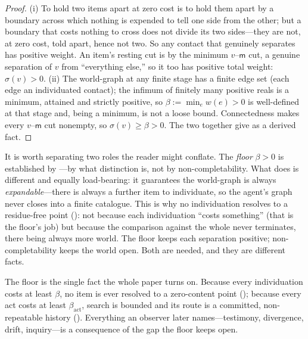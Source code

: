 \documentclass[11pt,twocolumn,a4paper]{article}
\newcommand{\wt}{w}
\newcommand{\med}{\mathsf{m}}
\newcommand{\flo}{\beta}
\newcommand{\str}{\sigma}
\begin{document}
\begin{proof}
(i) To hold two items apart at zero cost is to hold them apart by a boundary
across which nothing is expended to tell one side from the other; but a
boundary that costs nothing to cross does not divide its two sides---they are
not, at zero cost, told apart, hence not two. So any contact that genuinely
separates has positive weight. An item's resting cut is by
 the minimum $v$--$\med$ cut, a genuine separation of $v$ from
``everything else,'' so it too has positive total weight: $\str(v)>0$.
(ii) The world-graph at any finite stage has a finite edge set (each edge an
individuated contact); the infimum of finitely many positive reals is a
minimum, attained and strictly positive, so $\flo:=\min_e\wt(e)>0$ is
well-defined at that stage and, being a minimum, is not a loose bound.
Connectedness makes every $v$--$\med$ cut nonempty, so
$\str(v)\ge\flo>0$. The two together give  as a derived
fact.
\end{proof}

\begin{remark}
\label{rem:noncompletable-role}
It is worth separating two roles the reader might conflate. The
\emph{floor} $\flo>0$ is established by ---by what
distinction is, not by non-completability. What
 does is different and equally load-bearing: it
guarantees the world-graph is always \emph{expandable}---there is always a
further item to individuate, so the agent's graph never closes into a finite
catalogue. This is why no individuation resolves to a residue-free point
(): not because each individuation ``costs something''
(that is the floor's job) but because the comparison against the whole never
terminates, there being always more world. The floor keeps each separation
positive; non-completability keeps the world open. Both are needed, and they
are different facts.
\end{remark}

\begin{remark}
\label{rem:floormatters}
The floor is the single fact the whole paper turns on. Because every
individuation costs at least $\flo$, no item is ever resolved to a
zero-content point (); because every act costs at least
$\flo_{\mathrm{act}}$, search is bounded and its route is a committed,
non-repeatable history (). Everything an observer later
names---testimony, divergence, drift, inquiry---is a consequence of the
gap the floor keeps open.
\end{remark}
\end{document}
